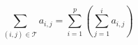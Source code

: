 \begin{displaymath}
 \sum_{(i,j)\in \mathcal T}a_{i,j} =\sum_{i=1}^{p}\left( \sum_{j=1}^{i} a_{i,j}\right)
\end{displaymath}

